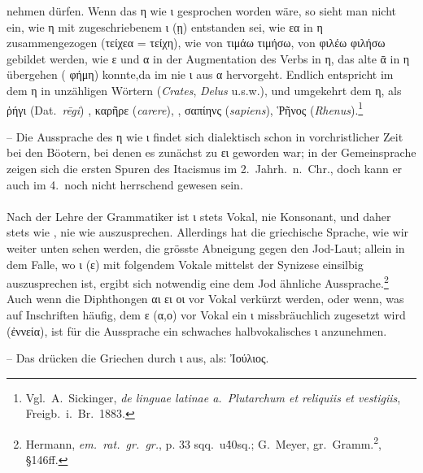 nehmen dürfen. Wenn das η wie ι gesprochen worden wäre, so sieht man nicht ein,
wie η mit zugeschriebenem ι (ῃ) entstanden sei, wie εα in η zusammengezogen
(τείχεα = τείχη), wie von τιμάω τιμήσω, von φιλέω φιλήσω gebildet werden, wie ε
und α in der Augmentation des Verbs in η, das alte ᾱ in η übergehen ( φήμη)
konnte,da im  nie ι aus α hervorgeht.
Endlich entspricht im
 dem η in unzähligen Wörtern  (\emph{Crates},
\emph{Delus} u.s.w.), und
umgekehrt dem    η, als ῥήγι
(Dat.\ \emph{rēgi}) ,
καρῆρε (\emph{carere}), , σαπίηνς (\emph{sapiens}), Ῥῆνος
(\emph{Rhenus}).\footnote{Vgl.\ A.~Sickinger, \emph{de linguae latinae a.\ Plutarchum et reliquiis et vestigiis}, Freigb.\ i.\ Br.\ 1883.}

\noindent -- Die
Aussprache des η wie ι findet sich dialektisch schon in vorchristlicher Zeit bei
den Böotern, bei denen es zunächst zu ει geworden war; in der Gemeinsprache
zeigen sich die ersten Spuren des Itacismus im 2.\ Jahrh.~n.~Chr., doch kann er
auch im 4.\ noch nicht herrschend gewesen sein.

\paragraph{} Nach der Lehre der Grammatiker ist ι stets Vokal, nie Konsonant, und daher stets
wie , nie wie  auszusprechen.
Allerdings hat die griechische Sprache, wie wir
weiter unten sehen werden, die grösste Abneigung gegen den Jod-Laut; allein in
dem Falle, wo ι (ε) mit folgendem Vokale mittelst der Synizese einsilbig
auszusprechen ist, ergibt sich notwendig eine dem Jod ähnliche
Aussprache.\footnote{Hermann, \emph{em.\ rat.\ gr.\ gr.}, p. 33 sqq.\ u\. 40sq.;
	G.~Meyer, gr.\ Gramm.\textsuperscript{2}, §146ff.}
Auch wenn die Diphthongen αι ει οι vor Vokal verkürzt werden, oder wenn, was auf
Inschriften häufig, dem ε (α,ο) vor Vokal ein ι missbräuchlich zugesetzt wird
(ἐννεία), ist für die Aussprache ein schwaches halbvokalisches ι anzunehmen.

\noindent -- Das   drücken die Griechen durch ι aus, als: Ἰούλιος.

